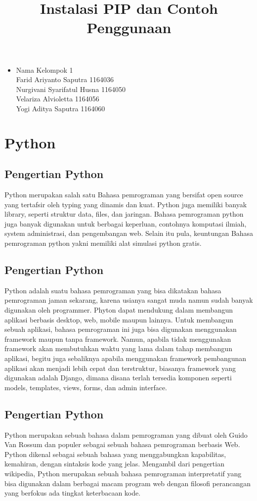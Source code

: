 \documentclass[12pt,a4paper]{article}
\begin{document}
\title{Instalasi PIP dan Contoh Penggunaan}
\maketitle

\begin{itemize}
\item
Nama Kelompok 1\\
Farid Ariyanto Saputra 1164036\\
Nurgivani Syarifatul Husna 1164050\\
Velariza Alvioletta 1164056\\
Yogi Aditya Saputra 1164060 \\
\end{itemize}

\section{Python}
\subsection{Pengertian Python}
Python merupakan salah satu Bahasa pemrograman yang bersifat open source yang tertafsir oleh typing yang dinamis dan kuat. Python juga memiliki banyak library, seperti struktur data, files, dan jaringan. Bahasa pemrograman python juga banyak digunakan untuk berbagai keperluan, contohnya komputasi ilmiah, system administrasi, dan pengembangan web. Selain itu pula, keuntungan Bahasa pemrograman python yakni memiliki alat simulasi python gratis.
\subsection{Pengertian Python}
Python adalah suatu bahasa pemrograman yang bisa dikatakan bahasa pemrograman jaman sekarang, karena usianya sangat muda namun sudah banyak digunakan oleh programmer. Phyton dapat mendukung dalam membangun aplikasi berbasis desktop, web, mobile maupun lainnya. Untuk membangun sebuah aplikasi, bahasa pemrograman ini juga bisa digunakan menggunakan framework maupun tanpa framework. Namun, apabila tidak menggunakan framework akan membutuhkan waktu yang lama dalam tahap membangun aplikasi, begitu juga sebaliknya apabila menggunakan framework pembangunan aplikasi akan menjadi lebih cepat dan terstruktur, biasanya framework yang digunakan adalah Django, dimana disana terlah tersedia komponen seperti models, templates, views, forms, dan admin interface.
\subsection{Pengertian Python}
Python merupakan sebuah bahasa dalam pemrograman yang dibuat oleh Guido Van Rossum dan populer sebagai sebuah bahasa pemrograman berbasis Web. Python dikenal sebagai sebuah bahasa yang menggabungkan kapabilitas, kemahiran, dengan sintaksis kode yang jelas. Mengambil dari pengertian wikipedia, Python merupakan sebuah bahasa pemrograman interpretatif yang bisa digunakan dalam berbagai macam program web dengan filosofi perancangan yang berfokus ada tingkat keterbacaan kode.
\end{document}
